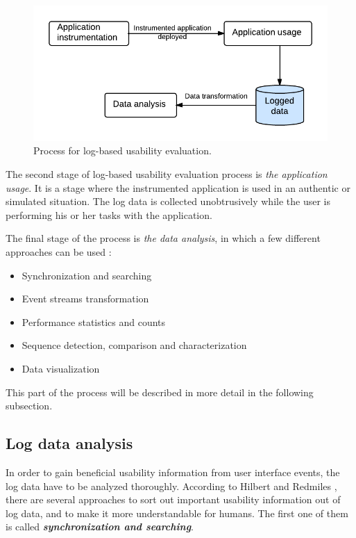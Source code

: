 \documentclass[12pt,a4paper,oneside,pdftex]{report}
\begin{document}
\begin{figure}[H]
  	\centerline{
  	\includegraphics[width=1.0\textwidth]{./images/logging_usability_process.png}
  	}
  	\caption{Process for log-based usability evaluation. \citep{RefWorks:24}}
	\label{fig:logging_usability_process}
\end{figure}

The second stage of log-based usability evaluation process is \emph{the application usage}. It is a stage where the instrumented application is used in an authentic or simulated situation. The log data is collected unobtrusively while the user is performing his or her tasks with the application. \citep{RefWorks:24}

The final stage of the process is \emph{the data analysis}, in which a few different approaches can be used \citep{RefWorks:24, RefWorks:25}:
\begin{itemize}
  \item Synchronization and searching
  \item Event streams transformation
  \item Performance statistics and counts
  \item Sequence detection, comparison and characterization 
  \item Data visualization
\end{itemize}
This part of the process will be described in more detail in the following subsection.

\subsection{Log data analysis}
\label{sec:analysis}
In order to gain beneficial usability information from user interface events, the log data have to be analyzed thoroughly. According to  Hilbert and Redmiles \citep{RefWorks:25}, there are several approaches to sort out important usability information out of log data, and to make it more understandable for humans.
The first one of them is called \textbf{\emph{synchronization and searching}}. 
\end{document}
